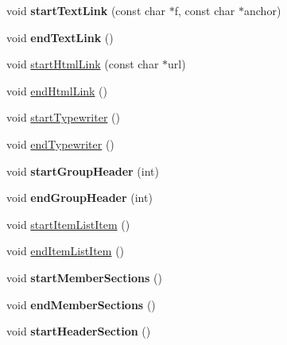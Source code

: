 \begin{DoxyCompactItemize}
\mbox{\label{class_r_t_f_generator_aa92286bf94c590a675ac75f8f5c1671e}} 
void {\bfseries start\+Text\+Link} (const char $\ast$f, const char $\ast$anchor)
\item 
\mbox{\label{class_r_t_f_generator_a6e7091e1279e20ea431ddd36a6984e77}} 
void {\bfseries end\+Text\+Link} ()
\item 
void \mbox{\hyperlink{class_r_t_f_generator_a265ab601396745bb97d5c6cee59329d6}{start\+Html\+Link}} (const char $\ast$url)
\item 
void \mbox{\hyperlink{class_r_t_f_generator_a73a4ea59114077ea461ff16757c8429b}{end\+Html\+Link}} ()
\item 
void \mbox{\hyperlink{class_r_t_f_generator_ac3760aa18a5102cd8e8b0a4969f0953d}{start\+Typewriter}} ()
\item 
void \mbox{\hyperlink{class_r_t_f_generator_af9e17986de22ddd0b3a4afe4449b4a2c}{end\+Typewriter}} ()
\item 
\mbox{\label{class_r_t_f_generator_a75318686aaf9a1d10be4fb9c7f90c98f}} 
void {\bfseries start\+Group\+Header} (int)
\item 
\mbox{\label{class_r_t_f_generator_a50b5dd2478b90fdeef6df695f4f27bf9}} 
void {\bfseries end\+Group\+Header} (int)
\item 
void \mbox{\hyperlink{class_r_t_f_generator_ae09155b5cf6fb7457ae598f22d65d045}{start\+Item\+List\+Item}} ()
\item 
void \mbox{\hyperlink{class_r_t_f_generator_a4d3cc3baac4adda9ef5da4c9e470871b}{end\+Item\+List\+Item}} ()
\item 
\mbox{\label{class_r_t_f_generator_a9a1d6fe62762d3b98b98955a73c78f83}} 
void {\bfseries start\+Member\+Sections} ()
\item 
\mbox{\label{class_r_t_f_generator_aff41f57d28ce59191f7527212ebdccb3}} 
void {\bfseries end\+Member\+Sections} ()
\item 
\mbox{\label{class_r_t_f_generator_ac7b3d7b5f30f3d12a9168c63d8558b01}} 
void {\bfseries start\+Header\+Section} ()
\item 
\mbox{\label{class_r_t_f_generator_af0d6ecfbd929b6bf84515c7a9c0c912f}} 

\end{DoxyCompactItemize}
